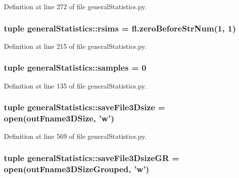 \-Definition at line 272 of file general\-Statistics.\-py.

\hypertarget{namespacegeneral_statistics_a67c2e718220e1b11a31ed770b5a97f94}{
\subsubsection[{rsims}]{\setlength{\rightskip}{0pt plus 5cm}tuple {\bf general\-Statistics\-::rsims} = fl.\-zero\-Before\-Str\-Num(1, 1)}}\label{namespacegeneral_statistics_a67c2e718220e1b11a31ed770b5a97f94}


\-Definition at line 215 of file general\-Statistics.\-py.

\hypertarget{namespacegeneral_statistics_a0f3c6fa133cfbef06ffd82dfbef8ace4}{
\subsubsection[{samples}]{\setlength{\rightskip}{0pt plus 5cm}tuple {\bf general\-Statistics\-::samples} = 0}}\label{namespacegeneral_statistics_a0f3c6fa133cfbef06ffd82dfbef8ace4}


\-Definition at line 135 of file general\-Statistics.\-py.

\hypertarget{namespacegeneral_statistics_aab92303ab2917a1f41abe3a499f353dc}{
\subsubsection[{save\-File3\-Dsize}]{\setlength{\rightskip}{0pt plus 5cm}tuple {\bf general\-Statistics\-::save\-File3\-Dsize} = open({\bf out\-Fname3\-D\-Size}, 'w')}}\label{namespacegeneral_statistics_aab92303ab2917a1f41abe3a499f353dc}


\-Definition at line 569 of file general\-Statistics.\-py.

\hypertarget{namespacegeneral_statistics_acebe9590443db7047d11646821848b6c}{
\subsubsection[{save\-File3\-Dsize\-G\-R}]{\setlength{\rightskip}{0pt plus 5cm}tuple {\bf general\-Statistics\-::save\-File3\-Dsize\-G\-R} = open({\bf out\-Fname3\-D\-Size\-Grouped}, 'w')}}\label{namespacegeneral_statistics_acebe9590443db7047d11646821848b6c}


